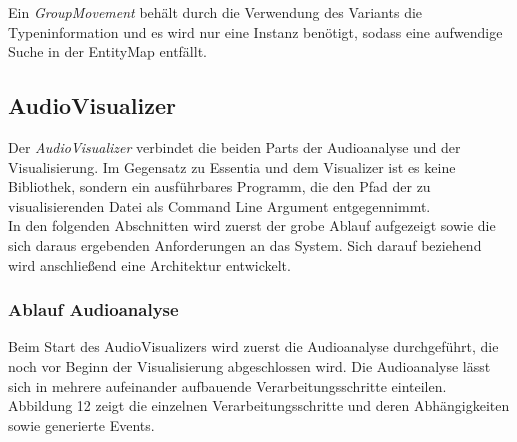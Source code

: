 \documentclass[11pt,a4paper]{article}
\begin{document}
Ein \textit{GroupMovement} behält durch die Verwendung des Variants die Typeninformation und es wird nur eine Instanz benötigt, sodass eine aufwendige Suche in der EntityMap entfällt.

\newpage
\subsection{AudioVisualizer}
Der \textit{AudioVisualizer} verbindet die beiden Parts der Audioanalyse und der Visualisierung. Im Gegensatz zu Essentia und dem Visualizer ist es keine Bibliothek, sondern ein ausführbares Programm, die den Pfad der zu visualisierenden Datei als Command Line Argument entgegennimmt.\\
In den folgenden Abschnitten wird zuerst der grobe Ablauf aufgezeigt sowie die sich daraus ergebenden Anforderungen an das System. Sich darauf beziehend wird anschließend eine Architektur entwickelt.

\subsubsection{Ablauf Audioanalyse}
Beim Start des AudioVisualizers wird zuerst die Audioanalyse durchgeführt, die noch vor Beginn der Visualisierung abgeschlossen wird. Die Audioanalyse lässt sich in mehrere aufeinander aufbauende Verarbeitungsschritte einteilen. Abbildung 12 zeigt die einzelnen Verarbeitungsschritte und deren Abhängigkeiten sowie generierte Events.
\end{document}
